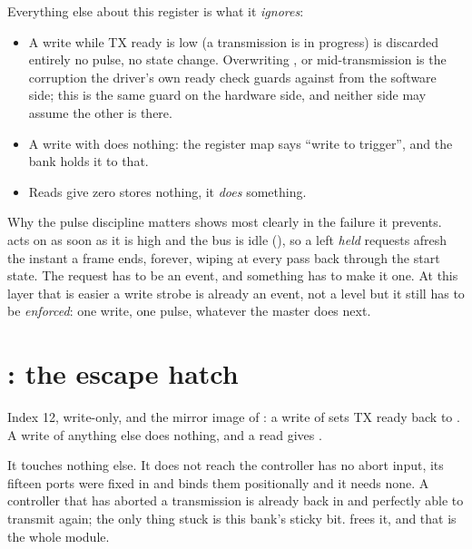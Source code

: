 Everything else about this register is what it \emph{ignores}:
\begin{itemize}
  \item A write while TX ready is low (a transmission is in progress) is discarded entirely
    \textemdash{} no pulse, no state change. Overwriting ,  or
     mid-transmission is the corruption the driver's own ready check guards against
    from the software side; this is the same guard on the hardware side, and neither side may assume
    the other is there.
  \item A write with  does nothing: the register map says ``write 
    to trigger'', and the bank holds it to that.
  \item Reads give zero \textemdash{}  stores nothing, it \emph{does} something.
\end{itemize}

Why the pulse discipline matters shows most clearly in the failure it prevents. 
acts on  as soon as it is high and the bus is idle (), so a 
left \emph{held} requests afresh the instant a frame ends, forever, wiping  at every pass
back through the start state. The request has to be an event, and something has to make it one. At
this layer that is easier \textemdash{} a write strobe is already an event, not a level \textemdash{}
but it still has to be \emph{enforced}: one write, one pulse, whatever the master does next.

\section{: the escape hatch}
\label{c18:sec:txabort}

Index 12, write-only, and the mirror image of : a write of  sets TX ready back
to . A write of anything else does nothing, and a read gives .

It touches nothing else. It does not reach  \textemdash{} the controller has no
abort input, its fifteen ports were fixed in  and  binds them
positionally \textemdash{} and it needs none. A controller that has aborted a transmission is already
back in  and perfectly able to transmit again; the only thing stuck is this bank's
sticky bit.  frees it, and that is the whole module.

